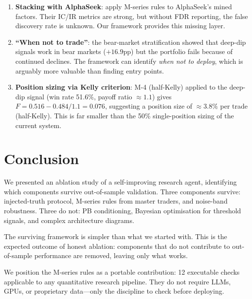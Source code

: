 \documentclass[11pt]{article}
\begin{document}
\begin{enumerate}
\item \textbf{Stacking with AlphaSeek}: apply M-series rules to AlphaSeek's
  mined factors. Their IC/IR metrics are strong, but without FDR reporting,
  the false discovery rate is unknown. Our framework provides this missing
  layer.
\item \textbf{``When not to trade''}: the bear-market stratification showed
  that deep-dip signals work in bear markets ($+16.9$pp) but the portfolio
  fails because of continued declines. The framework can identify \emph{when
  not to deploy}, which is arguably more valuable than finding entry points.
\item \textbf{Position sizing via Kelly criterion}: M-4 (half-Kelly) applied
  to the deep-dip signal (win rate 51.6\%, payoff ratio $\approx 1.1$) gives
  $F = 0.516 - 0.484/1.1 = 0.076$, suggesting a position size of $\approx
  3.8\%$ per trade (half-Kelly). This is far smaller than the 50\%
  single-position sizing of the current system.
\end{enumerate}

\section{Conclusion}

We presented an ablation study of a self-improving research agent,
identifying which components survive out-of-sample validation. Three
components survive: injected-truth protocol, M-series rules from master
traders, and noise-band robustness. Three do not: PB conditioning, Bayesian
optimisation for threshold signals, and complex architecture diagrams.

The surviving framework is simpler than what we started with. This is the
expected outcome of honest ablation: components that do not contribute to
out-of-sample performance are removed, leaving only what works.

We position the M-series rules as a portable contribution: 12 executable
checks applicable to any quantitative research pipeline. They do not require
LLMs, GPUs, or proprietary data---only the discipline to check before
deploying.
\end{document}
